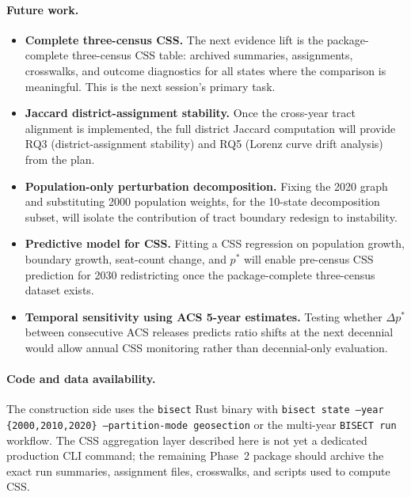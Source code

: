 \paragraph{Future work.}
\begin{itemize}
\item \textbf{Complete three-census CSS.}
  The next evidence lift is the package-complete three-census CSS table:
  archived summaries, assignments, crosswalks, and outcome diagnostics for all
  states where the comparison is meaningful.
  This is the next session's primary task.

\item \textbf{Jaccard district-assignment stability.}
  Once the cross-year tract alignment is implemented, the full district
  Jaccard computation will provide RQ3 (district-assignment stability)
  and RQ5 (Lorenz curve drift analysis) from the plan.

\item \textbf{Population-only perturbation decomposition.}
  Fixing the 2020 graph and substituting 2000 population weights, for the
  10-state decomposition subset, will isolate the contribution of tract
  boundary redesign to instability.

\item \textbf{Predictive model for CSS.}
  Fitting a CSS regression on population growth, boundary growth, seat-count
  change, and $p^*$ will enable pre-census CSS prediction for 2030
  redistricting once the package-complete three-census dataset exists.

\item \textbf{Temporal sensitivity using ACS 5-year estimates.}
  Testing whether $\Delta p^*$ between consecutive ACS releases predicts
  ratio shifts at the next decennial would allow annual CSS monitoring
  rather than decennial-only evaluation.
\end{itemize}

\paragraph{Code and data availability.}
The construction side uses the \texttt{bisect} Rust binary with
\texttt{bisect state --year \{2000,2010,2020\} --partition-mode geosection}
or the multi-year \texttt{BISECT run} workflow.  The CSS aggregation layer
described here is not yet a dedicated production CLI command; the remaining
Phase~2 package should archive the exact run summaries, assignment files,
crosswalks, and scripts used to compute CSS.

